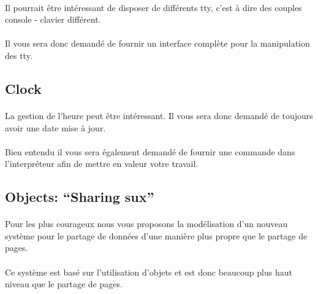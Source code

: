\documentclass[10pt,a4wide]{article}
\begin{document}
\paragraph{}

Il pourrait \^etre int\'eressant de disposer de diff\'erents tty, c'est \`a
dire des couples console - clavier diff\'erent.

\paragraph{}

Il vous sera donc demand\'e de fournir un interface compl\`ete pour la
manipulation des tty.

\subsection{Clock}

\paragraph{}

La gestion de l'heure peut \^etre int\'eressant. Il vous sera donc
demand\'e de toujours avoir une date mise \`a jour.

\paragraph{}

Bien entendu il vous sera \'egalement demand\'e de fournir une commande
dans l'interpr\'eteur afin de mettre en valeur votre travail.

\subsection{Objects: ``Sharing sux''}

\paragraph{}

Pour les plus courageux nous vous proposons la mod\'elisation d'un nouveau
syst\`eme pour le partage de donn\'ees d'une mani\`ere plus propre que
le partage de pages.

\paragraph{}

Ce syst\`eme est bas\'e sur l'utilisation d'objets et est donc beaucoup
plus haut niveau que le partage de pages.
\end{document}

